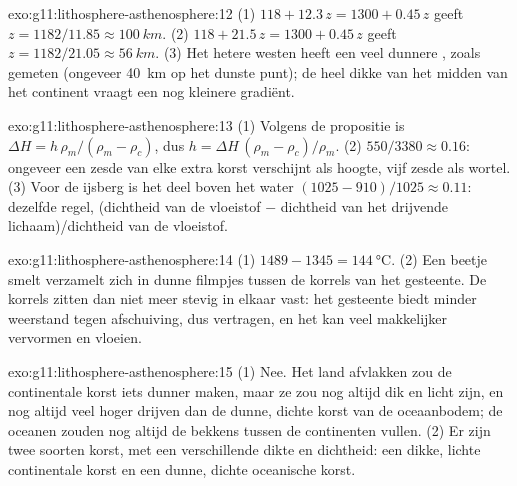 \begin{solution}{exo:g11:lithosphere-asthenosphere:12}
(1) $118 + 12.3\,z = 1300 + 0.45\,z$ geeft $z = 1182/11.85 \approx
\qty{100}{km}$. (2) $118 + 21.5\,z = 1300 + 0.45\,z$ geeft $z = 1182/21.05
\approx \qty{56}{km}$. (3) Het hetere westen heeft een veel dunnere ,
zoals gemeten (ongeveer \qty{40}{km} op het dunste punt); de heel dikke
 van het midden van het continent vraagt een nog kleinere gradiënt.
\end{solution}

\begin{solution}{exo:g11:lithosphere-asthenosphere:13}
(1) Volgens de propositie is $\Delta H = h\,\rho_m/(\rho_m - \rho_c)$, dus $h =
\Delta H\,(\rho_m - \rho_c)/\rho_m$. (2) $550/3380 \approx 0.16$: ongeveer een
zesde van elke extra korst verschijnt als hoogte, vijf zesde als wortel. (3) Voor
de ijsberg is het deel boven het water $(1025 - 910)/1025 \approx 0.11$:
dezelfde regel, (dichtheid van de vloeistof $-$ dichtheid van het drijvende
lichaam)/dichtheid van de vloeistof.
\end{solution}

\begin{solution}{exo:g11:lithosphere-asthenosphere:14}
(1) $1489 - 1345 = \qty{144}{\celsius}$. (2) Een beetje smelt verzamelt zich in
dunne filmpjes tussen de korrels van het gesteente. De korrels zitten dan niet
meer stevig in elkaar vast: het gesteente biedt minder weerstand tegen
afschuiving, dus  vertragen, en het kan veel makkelijker vervormen en vloeien.
\end{solution}

\begin{solution}{exo:g11:lithosphere-asthenosphere:15}
(1) Nee. Het land afvlakken zou de continentale korst iets dunner maken, maar ze
zou nog altijd dik en licht zijn, en nog altijd veel hoger drijven dan de dunne,
dichte korst van de oceaanbodem; de oceanen zouden nog altijd de bekkens tussen
de continenten vullen. (2) Er zijn twee soorten korst, met een verschillende
dikte en dichtheid: een dikke, lichte continentale korst en een dunne, dichte
oceanische korst.
\end{solution}

